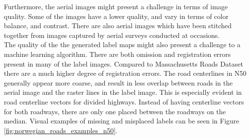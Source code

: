 Furthermore, the aerial images might present a challenge in terms of image quality. Some of the images have a lower quality, and vary in terms of color balance, and contrast. There are also aerial images which have been stitched together from images captured by aerial surveys conducted at occasions.\\

The quality of the the generated label maps might also present a challenge to a machine learning algorithm. There are both omission and registration errors present in many of the label images. Compared to Massachusetts Roads Dataset there are a much higher degree of registration errors. The road centerlines in N50 generally appear more coarse, and result in less overlap between roads in the aerial image and the raster lines in the label image. This is especially evident in road centerline vectors for divided highways. Instead of having centerline vectors for both roadways, there are only one placed between the roadways on the median. Visual examples of missing and misplaced labels can be seen in Figure \ref{fig:norwegian_roads_examples_n50}.\\

